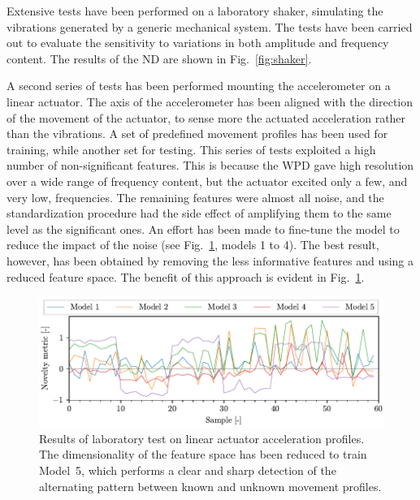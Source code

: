 Extensive tests have been performed on a laboratory shaker, simulating the vibrations generated by a generic mechanical system. The tests have been carried out to evaluate the sensitivity to variations in both amplitude and frequency content. The results of the ND are shown in Fig.~\ref{fig:shaker}.

A second series of tests has been performed mounting the accelerometer on a linear actuator. The axis of the accelerometer has been aligned with the direction of the movement of the actuator, to sense more the actuated acceleration rather than the vibrations. A set of predefined movement profiles has been used for training, while another set for testing. This series of tests exploited a high number of non-significant features. This is because the WPD gave high resolution over a wide range of frequency content, but the actuator excited only a few, and very low, frequencies. The remaining features were almost all noise, and the standardization procedure had the side effect of amplifying them to the same level as the significant ones. An effort has been made to fine-tune the model to reduce the impact of the noise (see Fig.~\ref{fig:linear}, models 1 to 4). The best result, however, has been obtained by removing the less informative features and using a reduced feature space. The benefit of this approach is evident in Fig.~\ref{fig:linear}.


\begin{figure}
    \includegraphics[width=\linewidth]{images/linear.pdf}
    \caption{Results of laboratory test on linear actuator acceleration profiles. The dimensionality of the feature space has been reduced to train Model~5, which performs a clear and sharp detection of the alternating pattern between known and unknown movement profiles.}
    \label{fig:linear}
\end{figure}